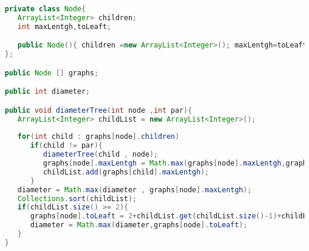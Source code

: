 \begin{lstlisting}[language=Java]
private class Node{
   ArrayList<Integer> children;
   int maxLentgh,toLeaft;

   public Node(){ children =new ArrayList<Integer>(); maxLentgh=toLeaft=0;}
};

public Node [] graphs;

public int diameter;

public void diameterTree(int node ,int par){
   ArrayList<Integer> childList = new ArrayList<Integer>();
	
   for(int child : graphs[node].children)
      if(child != par){
         diameterTree(child , node);
         graphs[node].maxLentgh = Math.max(graphs[node].maxLentgh,graphs[child].maxLentgh+1);
         childList.add(graphs[child].maxLentgh);
      }
   diameter = Math.max(diameter , graphs[node].maxLentgh);
   Collections.sort(childList);
   if(childList.size() >= 2){
      graphs[node].toLeaft = 2+childList.get(childList.size()-1)+childList.get(childList.size()-2);
      diameter = Math.max(diameter,graphs[node].toLeaft);
   }
}
\end{lstlisting}